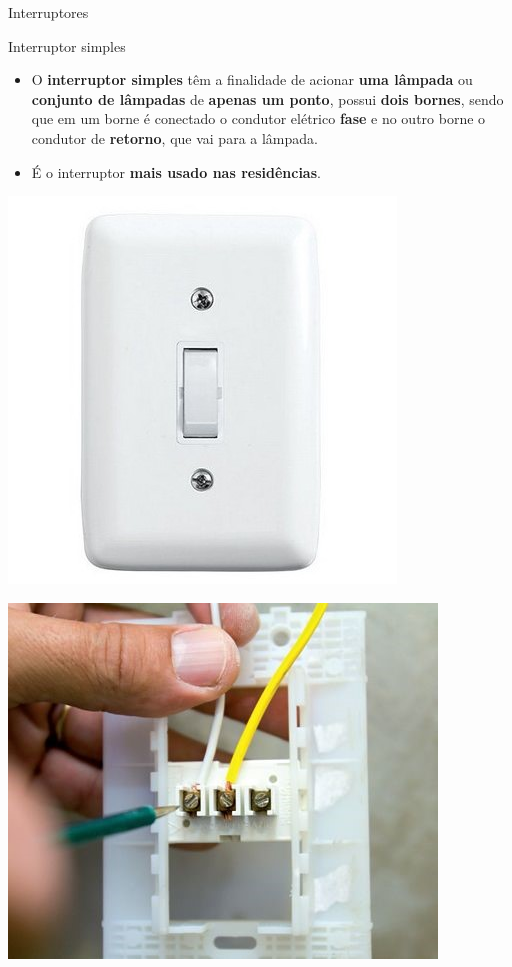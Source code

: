 \begin{frame}{Interruptores}
	\begin{block}{Interruptor simples}
		\begin{itemize}
			\item O \textbf{interruptor simples} têm a finalidade de acionar \textbf{uma lâmpada} ou \textbf{conjunto de lâmpadas} de \textbf{apenas um ponto}, possui \textbf{dois bornes}, sendo que em um borne é conectado o condutor elétrico \textbf{fase} e no outro borne o condutor de \textbf{retorno}, que vai para a lâmpada.
			\item É o interruptor \textbf{mais usado nas residências}.
		\end{itemize}
	\end{block}

	\begin{minipage}{0.48\linewidth}
		\centering
		\includegraphics[height=0.5\textheight]{Figuras/Ch08/fig1}
	\end{minipage}\hfill
	\begin{minipage}{0.48\linewidth}
		\centering
		\includegraphics[height=0.5\textheight]{Figuras/Ch08/fig14}
	\end{minipage}
\end{frame}



